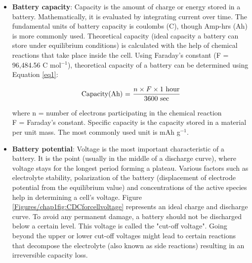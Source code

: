 \begin{itemize}
\item \textbf{Battery capacity}: Capacity is the amount of charge or energy stored in a battery. Mathematically, it is evaluated by integrating current over time. The fundamental units of battery capacity is coulombs (C), though Amp-hrs (Ah) is more commonly used.  Theoretical capacity (ideal capacity a battery can store under equilibrium conditions) is calculated with the help of chemical reactions that take place inside the cell. Using Faraday's constant (F = 96,484.56 C mol$^{-1}$), theoretical capacity of a battery can be determined using Equation \ref{eq1}:

\begin{equation} \label{eq1}
  \text{Capacity(Ah) = } \frac{n \times F \times 1 \text{ hour}}{3600 \text{ sec}}\\
\end{equation}

where n = number of electrons participating in the chemical reaction \\
F = Faraday's constant. Specific capacity is the capacity stored in a material per unit mass. The most commonly used unit is mAh g$^{-1}$. \\
\item \textbf{Battery potential}: Voltage is the  most important characteristic of a battery. It is the point (usually in the middle of a discharge curve), where voltage stays for the longest period forming a plateau. Various factors such as electrolyte stability, polarization of the battery (displacement of electrode potential from the equilibrium value) and concentrations of the active species help in determining a cell's voltage. Figure \ref{Figures/chap1fig:CDCforcellvoltage} represents an ideal charge and discharge curve. To avoid any permanent damage, a battery should not be discharged below a certain level. This voltage is called the "cut-off voltage". Going beyond the upper or lower cut-off voltages might lead to certain reactions that decompose the electrolyte (also known as side reactions) resulting in an irreversible capacity loss.\\


\end{itemize}
